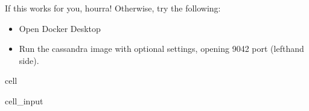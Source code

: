 \documentclass[letterpaper,10pt,english]{jupyterBook}
\begin{document}
\sphinxAtStartPar
If this works for you, hourra! Otherwise, try the following:
\begin{itemize}
\item {} 
\sphinxAtStartPar
Open Docker Desktop

\item {} 
\sphinxAtStartPar
Run the cassandra image with optional settings, opening 9042 port (left\sphinxhyphen{}hand side).

\end{itemize}

\begin{sphinxuseclass}{cell}\begin{sphinxVerbatimInput}

\begin{sphinxuseclass}{cell_input}
\begin{sphinxVerbatim}[commandchars=\\\{\}]
   
  \PYG{p}{[}\PYG{p}{]} 
  
\end{sphinxVerbatim}

\end{sphinxuseclass}\end{sphinxVerbatimInput}

\end{sphinxuseclass}
\end{document}
